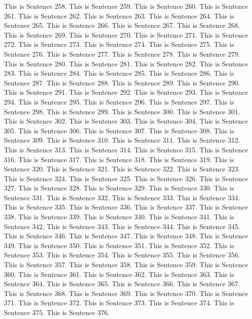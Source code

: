 \documentclass{article}
\begin{document}
This is Sentence 258.
This is Sentence 259.
This is Sentence 260.
This is Sentence 261.
This is Sentence 262.
This is Sentence 263.
This is Sentence 264.
This is Sentence 265.
This is Sentence 266.
This is Sentence 267.
This is Sentence 268.
This is Sentence 269.
This is Sentence 270.
This is Sentence 271.
This is Sentence 272.
This is Sentence 273.
This is Sentence 274.
This is Sentence 275.
This is Sentence 276.
This is Sentence 277.
This is Sentence 278.
This is Sentence 279.
This is Sentence 280.
This is Sentence 281.
This is Sentence 282.
This is Sentence 283.
This is Sentence 284.
This is Sentence 285.
This is Sentence 286.
This is Sentence 287.
This is Sentence 288.
This is Sentence 289.
This is Sentence 290.
This is Sentence 291.
This is Sentence 292.
This is Sentence 293.
This is Sentence 294.
This is Sentence 295.
This is Sentence 296.
This is Sentence 297.
This is Sentence 298.
This is Sentence 299.
This is Sentence 300.
This is Sentence 301.
This is Sentence 302.
This is Sentence 303.
This is Sentence 304.
This is Sentence 305.
This is Sentence 306.
This is Sentence 307.
This is Sentence 308.
This is Sentence 309.
This is Sentence 310.
This is Sentence 311.
This is Sentence 312.
This is Sentence 313.
This is Sentence 314.
This is Sentence 315.
This is Sentence 316.
This is Sentence 317.
This is Sentence 318.
This is Sentence 319.
This is Sentence 320.
This is Sentence 321.
This is Sentence 322.
This is Sentence 323.
This is Sentence 324.
This is Sentence 325.
This is Sentence 326.
This is Sentence 327.
This is Sentence 328.
This is Sentence 329.
This is Sentence 330.
This is Sentence 331.
This is Sentence 332.
This is Sentence 333.
This is Sentence 334.
This is Sentence 335.
This is Sentence 336.
This is Sentence 337.
This is Sentence 338.
This is Sentence 339.
This is Sentence 340.
This is Sentence 341.
This is Sentence 342.
This is Sentence 343.
This is Sentence 344.
This is Sentence 345.
This is Sentence 346.
This is Sentence 347.
This is Sentence 348.
This is Sentence 349.
This is Sentence 350.
This is Sentence 351.
This is Sentence 352.
This is Sentence 353.
This is Sentence 354.
This is Sentence 355.
This is Sentence 356.
This is Sentence 357.
This is Sentence 358.
This is Sentence 359.
This is Sentence 360.
This is Sentence 361.
This is Sentence 362.
This is Sentence 363.
This is Sentence 364.
This is Sentence 365.
This is Sentence 366.
This is Sentence 367.
This is Sentence 368.
This is Sentence 369.
This is Sentence 370.
This is Sentence 371.
This is Sentence 372.
This is Sentence 373.
This is Sentence 374.
This is Sentence 375.
This is Sentence 376.
\end{document}
